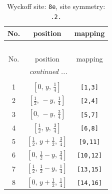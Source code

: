 \documentclass[fleqn,8pt]{jsarticle}
\begin{document}
\begin{longtable}{ccc}
\caption{Wyckoff site: {\tt 8e}, site symmetry: {\tt .2.}}
 \\
 \hline \hline
No. & position & mapping \\ \hline \endfirsthead

\multicolumn{2}{l}{\tablename\ \thetable{}} \\
 \hline \hline
No. & position & mapping \\ \hline \endhead

 \hline \hline
\multicolumn{2}{r}{\footnotesize\it continued ...} \\ \endfoot

 \hline \hline
\multicolumn{2}{r}{} \\ \endlastfoot

1 & $\left[ 0,\, y,\, \frac{1}{4} \right]$ & {\tt [1,3]} \\ \hline
2 & $\left[ \frac{1}{2},\, - y,\, \frac{1}{4} \right]$ & {\tt [2,4]} \\ \hline
3 & $\left[ 0,\, - y,\, \frac{3}{4} \right]$ & {\tt [5,7]} \\ \hline
4 & $\left[ \frac{1}{2},\, y,\, \frac{3}{4} \right]$ & {\tt [6,8]} \\ \hline
5 & $\left[ \frac{1}{2},\, y + \frac{1}{2},\, \frac{3}{4} \right]$ & {\tt [9,11]} \\ \hline
6 & $\left[ 0,\, \frac{1}{2} - y,\, \frac{3}{4} \right]$ & {\tt [10,12]} \\ \hline
7 & $\left[ \frac{1}{2},\, \frac{1}{2} - y,\, \frac{1}{4} \right]$ & {\tt [13,15]} \\ \hline
8 & $\left[ 0,\, y + \frac{1}{2},\, \frac{1}{4} \right]$ & {\tt [14,16]} \\
\end{longtable}
\renewcommand{\arraystretch}{1.2}
\end{document}
